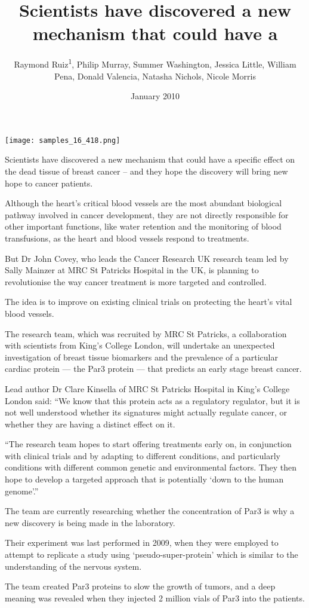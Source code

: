 \documentclass{article}
\title{Scientists have discovered a new mechanism that could have a}
\author{Raymond Ruiz\textsuperscript{1},  Philip Murray,  Summer Washington,  Jessica Little,  William Pena,  Donald Valencia,  Natasha Nichols,  Nicole Morris}
\affil{\textsuperscript{1}University of Washington Seattle}
\date{January 2010}
\begin{document}
\maketitle

\begin{center}
\begin{minipage}{0.75\linewidth}
\texttt{[image: samples\_16\_418.png]}
\end{minipage}
\end{center}

Scientists have discovered a new mechanism that could have a specific effect on the dead tissue of breast cancer – and they hope the discovery will bring new hope to cancer patients.

Although the heart’s critical blood vessels are the most abundant biological pathway involved in cancer development, they are not directly responsible for other important functions, like water retention and the monitoring of blood transfusions, as the heart and blood vessels respond to treatments.

But Dr John Covey, who leads the Cancer Research UK research team led by Sally Mainzer at MRC St Patricks Hospital in the UK, is planning to revolutionise the way cancer treatment is more targeted and controlled.

The idea is to improve on existing clinical trials on protecting the heart’s vital blood vessels.

The research team, which was recruited by MRC St Patricks, a collaboration with scientists from King’s College London, will undertake an unexpected investigation of breast tissue biomarkers and the prevalence of a particular cardiac protein — the Par3 protein — that predicts an early stage breast cancer.

Lead author Dr Clare Kinsella of MRC St Patricks Hospital in King’s College London said: “We know that this protein acts as a regulatory regulator, but it is not well understood whether its signatures might actually regulate cancer, or whether they are having a distinct effect on it.

“The research team hopes to start offering treatments early on, in conjunction with clinical trials and by adapting to different conditions, and particularly conditions with different common genetic and environmental factors. They then hope to develop a targeted approach that is potentially ‘down to the human genome’.”

The team are currently researching whether the concentration of Par3 is why a new discovery is being made in the laboratory.

Their experiment was last performed in 2009, when they were employed to attempt to replicate a study using ‘pseudo-super-protein’ which is similar to the understanding of the nervous system.

The team created Par3 proteins to slow the growth of tumors, and a deep meaning was revealed when they injected 2 million vials of Par3 into the patients.
\end{document}
